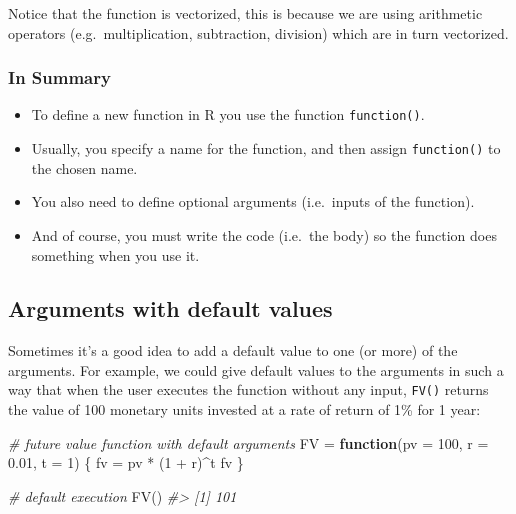 \documentclass[
]{book}
\newenvironment{Shaded}{\begin{snugshade}}{\end{snugshade}}
\newcommand{\AttributeTok}[1]{\textcolor[rgb]{0.77,0.63,0.00}{#1}}
\newcommand{\CommentTok}[1]{\textcolor[rgb]{0.56,0.35,0.01}{\textit{#1}}}
\newcommand{\ControlFlowTok}[1]{\textcolor[rgb]{0.13,0.29,0.53}{\textbf{#1}}}
\newcommand{\DecValTok}[1]{\textcolor[rgb]{0.00,0.00,0.81}{#1}}
\newcommand{\FloatTok}[1]{\textcolor[rgb]{0.00,0.00,0.81}{#1}}
\newcommand{\FunctionTok}[1]{\textcolor[rgb]{0.00,0.00,0.00}{#1}}
\newcommand{\NormalTok}[1]{#1}
\newcommand{\OtherTok}[1]{\textcolor[rgb]{0.56,0.35,0.01}{#1}}
\newcommand{\SpecialCharTok}[1]{\textcolor[rgb]{0.00,0.00,0.00}{#1}}
\begin{document}
Notice that the function is vectorized, this is because we are using arithmetic
operators (e.g.~multiplication, subtraction, division) which are in turn
vectorized.

\hypertarget{in-summary}{%
\subsubsection*{In Summary}\label{in-summary}}

\begin{itemize}
\item
  To define a new function in R you use the function \texttt{function()}.
\item
  Usually, you specify a name for the function, and then assign \texttt{function()}
  to the chosen name.
\item
  You also need to define optional arguments (i.e.~inputs of the function).
\item
  And of course, you must write the code (i.e.~the body) so the function does
  something when you use it.
\end{itemize}

\hypertarget{arguments-with-default-values}{%
\subsection{Arguments with default values}\label{arguments-with-default-values}}

Sometimes it's a good idea to add a default value to one (or more) of the
arguments. For example, we could give default values to the arguments in such
a way that when the user executes the function without any input, \texttt{FV()}
returns the value of 100 monetary units invested at a rate of return of
1\% for 1 year:

\begin{Shaded}
\begin{Highlighting}[]
\CommentTok{\# future value function with default arguments}
\NormalTok{FV }\OtherTok{=} \ControlFlowTok{function}\NormalTok{(}\AttributeTok{pv =} \DecValTok{100}\NormalTok{, }\AttributeTok{r =} \FloatTok{0.01}\NormalTok{, }\AttributeTok{t =} \DecValTok{1}\NormalTok{) \{}
\NormalTok{  fv }\OtherTok{=}\NormalTok{ pv }\SpecialCharTok{*}\NormalTok{ (}\DecValTok{1} \SpecialCharTok{+}\NormalTok{ r)}\SpecialCharTok{\^{}}\NormalTok{t}
\NormalTok{  fv}
\NormalTok{\}}

\CommentTok{\# default execution}
\FunctionTok{FV}\NormalTok{()}
\CommentTok{\#\textgreater{} [1] 101}
\end{Highlighting}
\end{Shaded}
\end{document}
